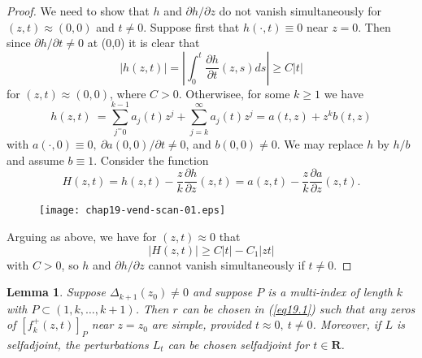 \documentclass{surv-l}
\theoremstyle{plain}
\newtheorem{lemma}[theorem]{Lemma}
\theoremstyle{definition}
\numberwithin{equation}{chapter}
\begin{document}
\begin{proof}
We need to show that $h$ and $\partial h/\partial z$ do not vanish simultaneously for $(z, t) \approx(0,0)$ and $t\neq 0$. Suppose first that $h(\cdot, t)\equiv 0$ near $z=0$. Then since $\partial h/\partial t\neq 0$ at (0,0) it is clear that
\begin{equation*}
|h(z, t)|=\left|\int_{0}^{t}\frac{\partial h}{\partial t}(z, s)ds\right|\geq C|t|
\end{equation*}
for $(z,t)\approx(0,0)$, where $C>0$. Otherwisee, for some $k\geq 1$ we have
\begin{equation*}
h(z, t)\ =\sum_{j^=0}^{k-1}a_{j}(t)z^{j}+\sum_{j=k}^{\infty}a_{j}(t)z^{j}=a(t, z)+z^{k}b(t, z)
\end{equation*}
with $a(\cdot, 0)\equiv 0,\ \partial a(0, 0)/\partial t\neq 0$, and $b(0,0)\neq 0$. We may replace $h$ by $h/b$ and assume $b\equiv 1$. Consider the function
\begin{equation*}
H(z,t)=h(z,t)-\frac{z}{k}\frac{\partial h}{\partial z}(z,t)=a(z, t)-\frac{z}{k}\frac{\partial a}{\partial z}(z, t).
\end{equation*}
\begin{figure}
\texttt{[image: chap19-vend-scan-01.eps]}
\caption{}\label{fig01}
\end{figure}
Arguing as above, we have for $(z,t)\approx 0$ that
\begin{equation*}
|H(z, t)|\geq C|t|-C_{1}|zt|
\end{equation*}
with $C>0$, so $h$ and $\partial h/\partial z$ cannot vanish simultaneously if $t\neq 0.$
\end{proof}
\setcounter{theorem}{11}
\begin{lemma}\label{lem19.12} Suppose $\Delta_{k+1}(z_{0})\neq 0$ and
suppose $P$ is a multi-index of length $k$ with $P\subset(1,k,\ldots,k+1)$. Then $r$ can be chosen in \emph{(\ref{eq19.1})} such that any zeros of $[f_{k}^{+} (z, t)]_{P}$ near $z = z_{0}$ are simple, provided $t\approx 0,\ t\neq 0$. Moreover, if $L$ is selfadjoint, the perturbations $L_{t}$ can be chosen selfadjoint for $t\in \mathbf{R}$.
\end{lemma}
\end{document}
